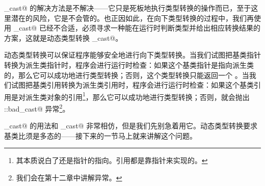 \lstinline@static_cast@ 的解决方法是不解决——它只是死板地执行类型转换的操作而已，至于这里潜在的风险，它是不会管的。也正因如此，在向下类型转换的过程中，我们再使用 \lstinline@static_cast@ 已经不合适，必须寻求一种能在运行时判断类型并给出相应转换结果的方案，这就是动态类型转换 \lstinline@dynamic_cast@。\par
动态类型转换可以保证程序能够安全地进行向下类型转换。当我们试图把基类指针转换为派生类指针时，程序会进行运行时检查：如果这个基类指针是指向派生类的，那么它可以成功地进行类型转换；否则，这个类型转换只能返回一个 \lstinline@nullptr@。当我们试图把基类引用转换为派生类引用时，程序会进行运行时检查：如果这个基类引用是对派生类对象的引用\footnote{其本质说白了还是指针的指向。引用都是靠指针来实现的。}，那么它可以成功地进行类型转换；否则，就会抛出 \lstinline@std::bad_cast@ 异常\footnote{我们会在第十二章中讲解异常。}。\par
\lstinline@dynamic_cast@ 的用法和 \lstinline@static_cast@ 非常相仿，但是我们先别急着用它。动态类型转换要求基类比须是多态的——接下来的一节马上就来讲解这个问题。\par
